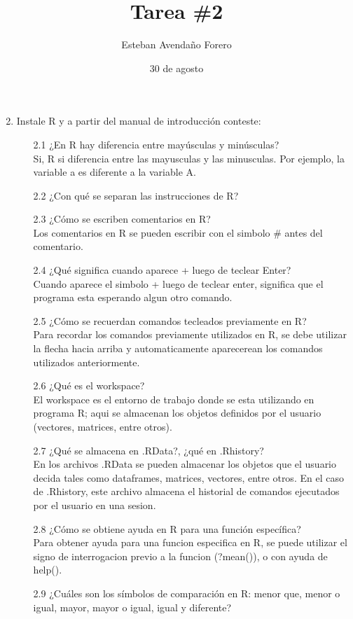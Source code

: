 \documentclass[letterpaper, 12pt]{article}
\title{Tarea \#2}
\author{Esteban Avendaño Forero}
\date{30 de agosto}
\begin{document}

\maketitle

\begin{enumerate}
\setcounter{enumi}{1}
\item Instale R y a partir del manual de introducción conteste:
\begin{enumerate}
\item[2.1] ¿En R hay diferencia entre mayúsculas y minúsculas?\\
Si, R si diferencia entre las mayusculas y las minusculas. Por ejemplo, la variable a es diferente a la variable A.
\item[2.2] ¿Con qué se separan las instrucciones de R?
\item[2.3] ¿Cómo se escriben comentarios en R?\\
Los comentarios en R se pueden escribir con el simbolo \# antes del comentario.
\item[2.4] ¿Qué significa cuando aparece + luego de teclear Enter?\\
Cuando aparece el simbolo + luego de teclear enter, significa que el programa esta esperando algun otro comando.
\item[2.5] ¿Cómo se recuerdan comandos tecleados previamente en R?\\
Para recordar los comandos previamente utilizados en R, se debe utilizar la flecha hacia arriba y automaticamente aparecerean los comandos utilizados anteriormente.
\item[2.6] ¿Qué es el workspace?\\
El workspace es el entorno de trabajo donde se esta utilizando en programa R; aqui se almacenan los objetos definidos por el usuario (vectores, matrices, entre otros).
\item[2.7] ¿Qué se almacena en .RData?, ¿qué en .Rhistory?\\
En los archivos .RData se pueden almacenar los objetos que el usuario decida tales como dataframes, matrices, vectores, entre otros. En el caso de .Rhistory, este archivo almacena el historial de comandos ejecutados por el usuario en una sesion.
\item[2.8] ¿Cómo se obtiene ayuda en R para una función específica?\\
Para obtener ayuda para una funcion especifica en R, se puede utilizar el signo de interrogacion previo a la funcion (?mean()), o con ayuda de help().
\item[2.9] ¿Cuáles son los símbolos de comparación en R: menor que, menor o igual, mayor, mayor o igual, igual y diferente?\\

\end{enumerate}
\end{enumerate}
\end{document}
